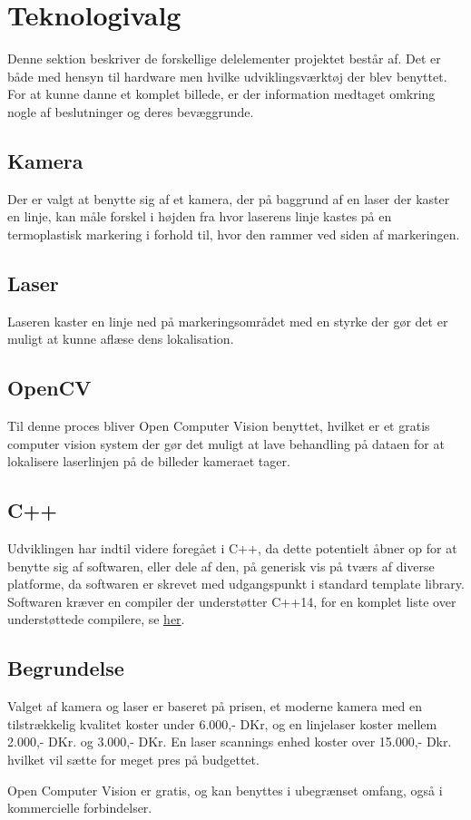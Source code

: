 \section{Teknologivalg}
Denne sektion beskriver de forskellige delelementer projektet består af. Det er både med hensyn til hardware men hvilke udviklingsværktøj der blev benyttet. For at kunne danne et komplet billede, er der information medtaget omkring nogle af beslutninger og deres bevæggrunde. 

\subsection{Kamera}
Der er valgt at benytte sig af et kamera, der på baggrund af en laser der kaster en linje, kan måle forskel i højden fra hvor laserens linje kastes på en termoplastisk markering i forhold til, hvor den rammer ved siden af markeringen.

\subsection{Laser}
Laseren kaster en linje ned på markeringsområdet med en styrke der gør det er muligt at kunne aflæse dens lokalisation.

\subsection{OpenCV}
Til denne proces bliver Open Computer Vision \cite{OpenCV} benyttet, hvilket er et gratis computer vision system der gør det muligt at lave behandling på dataen for at lokalisere laserlinjen på de billeder kameraet tager.

\subsection{C++}
Udviklingen har indtil videre foregået i C++, da dette potentielt åbner op for at benytte sig af softwaren, eller dele af den, på generisk vis på tværs af diverse platforme, da softwaren er skrevet med udgangspunkt i standard template library.
Softwaren kræver en compiler der understøtter C++14, for en komplet liste over understøttede compilere, se \href{http://en.cppreference.com/w/cpp/compiler_support}{her}.

\subsection{Begrundelse}
Valget af kamera og laser er baseret på prisen, et moderne kamera med en tilstrækkelig kvalitet koster under 6.000,- DKr, og en linjelaser koster mellem 2.000,- DKr. og 3.000,- DKr. En laser scannings enhed koster over 15.000,- Dkr. hvilket vil sætte for meget pres på budgettet.

Open Computer Vision er gratis, og kan benyttes i ubegrænset omfang, også i kommercielle forbindelser.

